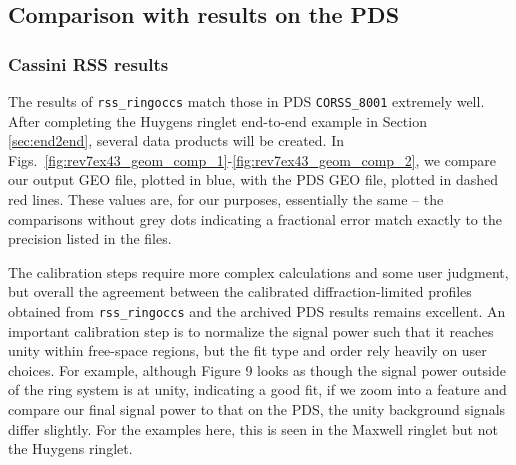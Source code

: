 \documentclass[titlepage, 12pt]{article}
\begin{document}
        \subsection{Comparison with results on the PDS}
            \label{sec:pds_valid}
            \subsubsection{Cassini RSS results}
            The results of \texttt{rss\_ringoccs} match those in PDS
            \texttt{CORSS\_8001} extremely well. After completing the Huygens ringlet
            end-to-end example in Section \ref{sec:end2end}, several data products will be created. In 
            Figs.~\ref{fig:rev7ex43_geom_comp_1}-\ref{fig:rev7ex43_geom_comp_2}, we compare our output GEO file, plotted in blue, with the PDS GEO file, plotted in dashed red lines. These values are, for our purposes, essentially the same -- the comparisons without grey dots indicating a fractional error match exactly to the precision listed in the files. 
            \par\hfill\par
            The calibration steps require more complex calculations and some user judgment, but overall the agreement between the calibrated diffraction-limited profiles obtained from \texttt{rss\_ringoccs} and the archived PDS results remains excellent. An important calibration step is to normalize the signal power such that it reaches unity within free-space regions, but the fit type and order rely heavily on user choices. For example, although Figure 9 looks as though the signal power outside of the ring system is at unity, indicating a good fit, if we zoom into a feature and compare our final signal power to that on the PDS, the unity background signals differ slightly. For the examples here, this is seen in the Maxwell ringlet but not the Huygens ringlet. 
         
\end{document}
